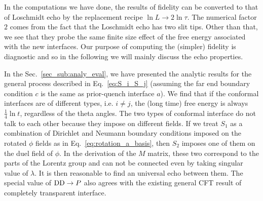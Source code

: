 

In the computations we have done, the results of fidelity can be converted to that of Loschmidt echo by the replacement recipe $ \ln L \rightarrow 2 \ln \tau$. The numerical factor $2$ comes from the fact that the Loschmidt echo has two slit tips. Other than that, we see that they probe the same finite size effect of the free energy associated with the new interfaces. Our purpose of computing the (simpler) fidelity is diagnostic and so in the following we will mainly discuss the echo properties. 

In the Sec.~\ref{sec_sub:analy_eval}, we have presented the analytic results for the general process {\color{red}described in Eq.~\eqref{eq:S_i_S_j}} (assuming the far end boundary condition $c$ is the same as prior-quench interface $a$).
We find that if the conformal interfaces are of different types, i.e. $i \ne j$, the (long time) free energy is always $\frac{1}{4} \ln t$, regardless of the theta angles. The two types of conformal interface do not talk to each other because they impose on different fields. If we treat $S_1$ as a combination of Dirichlet and Neumann boundary conditions imposed on the rotated $\phi$ fields as in Eq.~\eqref{eq:rotation_a_basis}, then $S_2$ imposes one of them on the duel field of $\phi$. In the derivation of the $M$ matrix, these two correspond to the parts of the Lorentz group and can not be connected even by taking singular value of $\lambda$. It is then reasonable to find an universal echo between them. The special value of ${\rm DD} \rightarrow P$ also agrees with the existing general CFT result of completely transparent interface\cite{stephan_logarithmic_2013,stephan_local_2011,vasseur_universal_2014,vasseur_crossover_2013,kennes_universal_2014}. 



